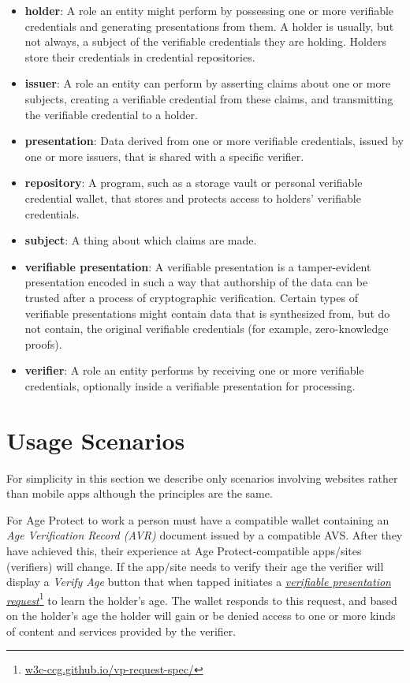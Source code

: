 \documentclass[11pt, oneside]{article}   	%
\newcommand{\hyperfootnote}[1][]{\def\ArgI{{#1}}\hyperfootnoteRelay}
\newcommand\hyperfootnoteRelay[2][]{\href{#1#2}{\ArgI}\footnote{\href{#1#2}{#2}}}
\begin{document}
\begin{itemize}
	\item \textbf{holder}: A role an entity might perform by possessing one or more verifiable credentials and generating presentations from them. A holder is usually, but not always, a subject of the verifiable credentials they are holding. Holders store their credentials in credential repositories.
	\item \textbf{issuer}: A role an entity can perform by asserting claims about one or more subjects, creating a verifiable credential from these claims, and transmitting the verifiable credential to a holder.
	\item \textbf{presentation}: Data derived from one or more verifiable credentials, issued by one or more issuers, that is shared with a specific verifier.
	\item \textbf{repository}: A program, such as a storage vault or personal verifiable credential wallet, that stores and protects access to holders' verifiable credentials.
	\item \textbf{subject}: A thing about which claims are made. 
	\item \textbf{verifiable presentation}: A verifiable presentation is a tamper-evident presentation encoded in such a way that authorship of the data can be trusted after a process of cryptographic verification. Certain types of verifiable presentations might contain data that is synthesized from, but do not contain, the original verifiable credentials (for example, zero-knowledge proofs).
	\item \textbf{verifier}: A role an entity performs by receiving one or more verifiable credentials, optionally inside a verifiable presentation for processing. 
\end{itemize}	

\section{Usage Scenarios} 

For simplicity in this section we describe only scenarios involving websites rather than mobile apps although the principles are the same.

For Age Protect to work a person must have a compatible wallet containing an \emph{Age Verification Record (AVR)} document issued by a compatible AVS. After they have achieved this, their experience at Age Protect-compatible apps/sites (verifiers) will change. If the app/site needs to verify their age the verifier will display a \emph{Verify Age} button that when tapped initiates a \hyperfootnote[\emph{verifiable presentation request}][https://]{w3c-ccg.github.io/vp-request-spec/} to learn the holder's age. The wallet responds to this request, and based on the holder's age the holder will gain or be denied access to one or more kinds of content and services provided by the verifier. 
\end{document}

